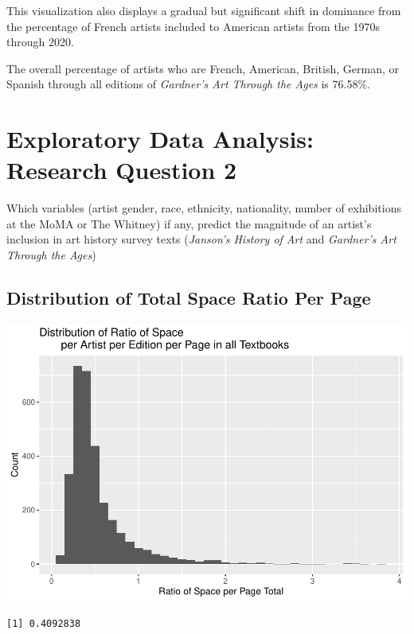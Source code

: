\documentclass[
  letterpaper,
  DIV=11,
  numbers=noendperiod]{scrreprt}
\begin{document}
This visualization also displays a gradual but significant shift in
dominance from the percentage of French artists included to American
artists from the 1970s through 2020.

The overall percentage of artists who are French, American, British,
German, or Spanish through all editions of \emph{Gardner's Art Through
the Ages} is 76.58\%.

\hypertarget{exploratory-data-analysis-research-question-2}{%
\section{Exploratory Data Analysis: Research Question
2}\label{exploratory-data-analysis-research-question-2}}

Which variables (artist gender, race, ethnicity, nationality, number of
exhibitions at the MoMA or The Whitney) if any, predict the magnitude of
an artist's inclusion in art history survey texts (\emph{Janson's
History of Art} and \emph{Gardner's Art Through the Ages})

\hypertarget{distribution-of-total-space-ratio-per-page}{%
\subsection{Distribution of Total Space Ratio Per
Page}\label{distribution-of-total-space-ratio-per-page}}

\includegraphics{Chapter1/Chapter1_files/figure-pdf/spaceratioperpagetotal-1.pdf}

\begin{verbatim}
[1] 0.4092838
\end{verbatim}
\end{document}
